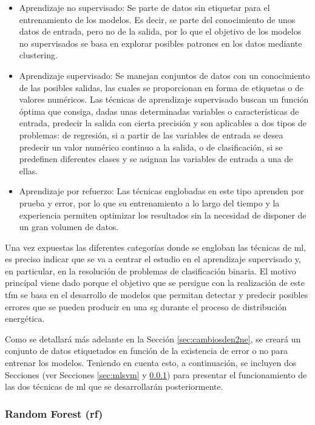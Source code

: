 \begin{itemize}
    \item Aprendizaje no supervisado: Se parte de datos sin etiquetar para el entrenamiento de los modelos. Es decir, se parte del conocimiento de unos datos de entrada, pero no de la salida, por lo que el objetivo de los modelos no supervisados se basa en explorar posibles patrones en los datos mediante clustering.
    \item Aprendizaje supervisado: Se manejan conjuntos de datos con un conocimiento de las posibles salidas, las cuales se proporcionan en forma de etiquetas o de valores numéricos. Las técnicas de aprendizaje supervisado buscan un función óptima que consiga, dadas unas determinadas variables o características de entrada, predecir la salida con cierta precisión y son aplicables a dos tipos de problemas: de regresión, si a partir de las variables de entrada se desea predecir un valor numérico continuo a la salida, o de clasificación, si se predefinen diferentes clases y se asignan las variables de entrada a una de ellas. 
    \item Aprendizaje por refuerzo: Las técnicas englobadas en este tipo aprenden por prueba y error, por lo que su entrenamiento a lo largo del tiempo y la experiencia permiten optimizar los resultados sin la necesidad de disponer de un gran volumen de datos.
\end{itemize}

Una vez expuestas las diferentes categorías donde se engloban las técnicas de \gls{ml}, es preciso indicar que se va a centrar el estudio en el aprendizaje supervisado y, en particular, en la resolución de problemas de clasificación binaria. El motivo principal viene dado porque el objetivo que se persigue con la realización de este \gls{tfm} se basa en el desarrollo de modelos que permitan detectar y predecir posibles errores que se pueden producir en una \gls{sg} durante el proceso de distribución energética. 

\vspace{3mm}

Como se detallará más adelante en la Sección \ref{sec:cambiosden2ne}, se creará un conjunto de datos etiquetados en función de la existencia de error o no para entrenar los modelos. Teniendo en cuenta esto, a continuación, se incluyen dos Secciones (ver Secciones \ref{sec:mlsvm} y \ref{sec:mlrf}) para presentar el funcionamiento de las dos técnicas de \gls{ml} que se desarrollarán posteriormente.

\subsubsection{Random Forest (\acrshort{rf})}
\label{sec:mlrf}

